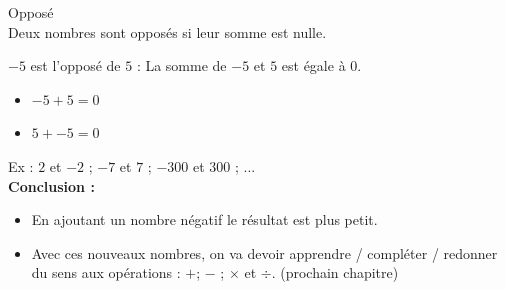 \begin{Definition}{Opposé}\\
  Deux nombres sont opposés si leur somme est nulle. 
\end{Definition}

 $-5$ est l'opposé de $5$ : La somme de $-5$ et $5$ est égale à $0$.

\begin{itemize}[label={$\bullet$}]
  \item $-5 + 5 = 0$
  \item $5 + -5 = 0$ 
\end{itemize} 

Ex : $2$ et $-2$ ; $-7$ et $7$ ; $-300$ et $300$ ; ... \\

\textbf{Conclusion : }

\begin{itemize}[label={$\bullet$}]
  \item En ajoutant un nombre négatif le résultat est plus petit. 
  \item Avec ces nouveaux nombres, on va devoir apprendre / compléter / redonner du sens aux opérations : $+$; $-$ ; $\times$ et $\div$. (prochain chapitre)
\end{itemize} 


